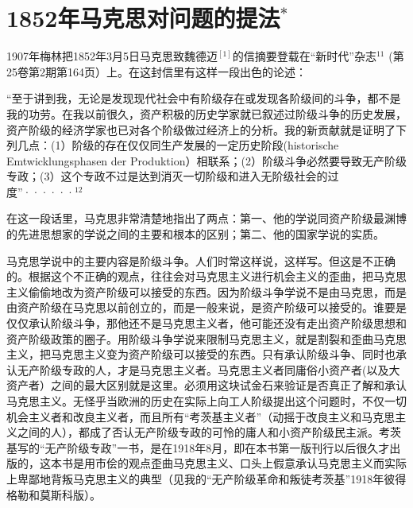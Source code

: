 \chapter{1852年马克思对问题的提法$^{*}$} %

1907年梅林把1852年3月5日马克思致魏德迈$^{[1]}$的信摘要登载在“新时代”杂志$^{11}$ (第25卷第2期第164页）上。在这封信里有这样一段出色的论述：

\pskip 
\leftskip=10mm
\small

“至于讲到我，无论是发现现代社会中有阶级存在或发现各阶级间的斗争，都不是我的功劳。在我以前很久，资产积极的历史学家就已叙述过阶级斗争的历史发展，资产阶级的经济学家也已对各个阶级做过经济上的分析。我的新贡献就是证明了下列几点：(1）阶级的存在仅仅同生产发展的一定历史阶段(historische Emtwicklungsphasen der Produktion）相联系；(2）阶级斗争必然要导致无产阶级专政；(3）这个专政不过是达到消灭一切阶级和进入无阶级社会的过度”······$^{12}$

\leftskip=0mm
\normalsize
\pskip 

在这一段话里，马克思非常清楚地指出了两点：第一、他的学说同资产阶级最渊博的先进思想家的学说之间的主要和根本的区别；第二、他的国家学说的实质。

马克思学说中的主要内容是阶级斗争。人们时常这样说，这样写。但这是不正确的。根据这个不正确的观点，往往会对马克思主义进行机会主义的歪曲，把马克思主义偷偷地改为资产阶级可以接受的东西。因为阶级斗争学说{\kaishu 不是}由马克思，而是由资产阶级在马克思{\kaishu 以前}创立的，而是一般来说，是资产阶级{\kaishu 可以接受的}。谁要是{\kaishu 仅仅}承认阶级斗争，那他还不是马克思主义者，他可能还没有走出资产阶级思想和资产阶级政策的圈子。用阶级斗争学说来限制马克思主义，就是割裂和歪曲马克思主义，把马克思主义变为资产阶级可以接受的东西。只有承认阶级斗争、{\kaishu 同时}也承认{\kaishu 无产阶级专政}的人，才是马克思主义者。马克思主义者同庸俗小资产者(以及大资产者）之间的最大区别就是这里。必须用这块试金石来验证是否{\kaishu 真正}了解和承认马克思主义。无怪乎当欧洲的历史在{\kaishu 实际上}向工人阶级提出这个问题时，不仅一切机会主义者和改良主义者，而且所有“考茨基主义者”（动摇于改良主义和马克思主义之间的人），都成了否认无产阶级专政的可怜的庸人和小资产阶级民主派。考茨基写的“无产阶级专政”一书，是在1918年8月，即在本书第一版刊行以后很久才出版的，这本书是用市侩的观点歪曲马克思主义、{\kaishu 口头}上假意承认马克思主义而{\kaishu 实际上}卑鄙地背叛马克思主义的典型（见我的“无产阶级革命和叛徒考茨基”1918年彼得格勒和莫斯科版）。

